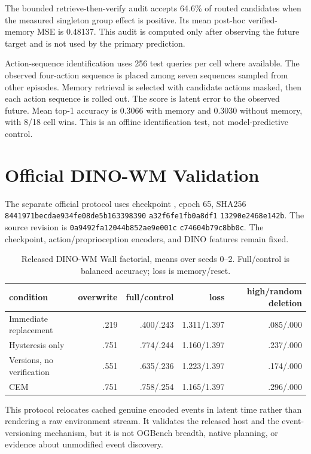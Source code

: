 The bounded retrieve-then-verify audit accepts 64.6\% of routed candidates
when the measured singleton group effect is positive. Its mean post-hoc
verified-memory MSE is 0.48137. This audit is computed only after observing the
future target and is not used by the primary prediction.

Action-sequence identification uses 256 test queries per cell where available.
The observed four-action sequence is placed among seven sequences sampled
from other episodes. Memory retrieval is selected with candidate actions
masked, then each action sequence is rolled out. The score is latent error to
the observed future. Mean top-1 accuracy is 0.3066 with memory and 0.3030
without memory, with 8/18 cell wins. This is an offline identification test,
not model-predictive control.

\section{Official DINO-WM Validation}
\label{app:official}

The separate official protocol uses checkpoint
, epoch 65,
SHA256
\texttt{8441971becdae934fe08de5b163398390}\allowbreak
\texttt{a32f6fe1fb0a8df1}\allowbreak
\texttt{13290e2468e142b}.
The source revision is
\texttt{0a9492fa12044b852ae9e001c}\allowbreak
\texttt{c74604b79c8bb0c}. The checkpoint, action/proprioception encoders, and
DINO features remain fixed.

\begin{table}[h]
\centering\scriptsize
\caption{Released DINO-WM Wall factorial, means over seeds 0--2.
Full/control is balanced accuracy; loss is memory/reset.}
\label{tab:official-full}
\begin{tabular}{lrrrr}
\toprule
condition & overwrite & full/control & loss & high/random deletion\\
\midrule
Immediate replacement & .219 & .400/.243 & 1.311/1.397 & .085/.000\\
Hysteresis only & .751 & .774/.244 & 1.160/1.397 & .237/.000\\
Versions, no verification & .551 & .635/.236 & 1.223/1.397 & .174/.000\\
CEM & .751 & .758/.254 & 1.165/1.397 & .296/.000\\
\bottomrule
\end{tabular}
\end{table}

This protocol relocates cached genuine encoded events in latent time rather
than rendering a raw environment stream. It validates the released host and
the event-versioning mechanism, but it is not OGBench breadth, native planning,
or evidence about unmodified event discovery.

